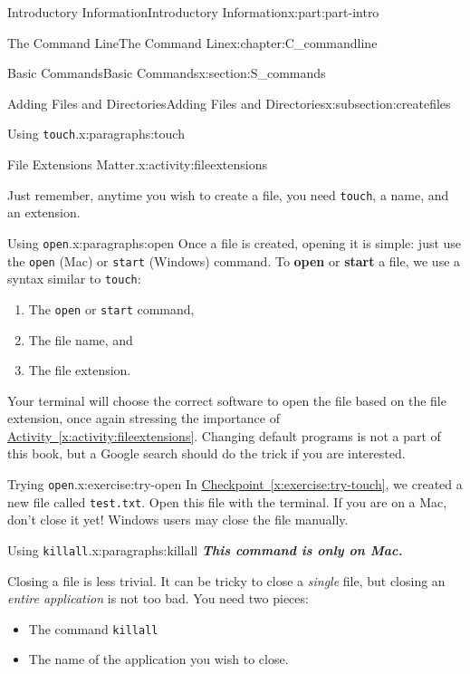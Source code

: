 \documentclass[oneside,10pt,]{book}
\newcommand{\xreffont}{\relax}
\newcommand{\mono}[1]{\texttt{#1}}
\newcommand{\alert}[1]{\textbf{\textit{#1}}}
\newcommand{\terminology}[1]{\textbf{#1}}
\begin{document}
\begin{partptx}{Introductory Information}{}{Introductory Information}{}{}{x:part:part-intro}
\begin{chapterptx}{The Command Line}{}{The Command Line}{}{}{x:chapter:C_commandline}
\begin{sectionptx}{Basic Commands}{}{Basic Commands}{}{}{x:section:S_commands}
\begin{subsectionptx}{Adding Files and Directories}{}{Adding Files and Directories}{}{}{x:subsection:createfiles}
\begin{paragraphs}{Using \mono{touch}.}{x:paragraphs:touch}
\begin{activity}{File Extensions Matter.}{x:activity:fileextensions}
\end{activity}%
Just remember, anytime you wish to create a file, you need \mono{touch}, a name, and an extension.%
\end{paragraphs}%
\begin{paragraphs}{Using \mono{open}.}{x:paragraphs:open}%
\index{\mono{open}}%
\index{\mono{start}}%
%
%
%
Once a file is created, opening it is simple: just use the \mono{open} (Mac) or \mono{start} (Windows) command. To \terminology{open} or \terminology{start} a file, we use a syntax similar to \mono{touch}:%
\begin{enumerate}
\item{}The \mono{open} or \mono{start} command,%
\item{}The file name, and%
\item{}The file extension.%
\end{enumerate}
Your terminal will choose the correct software to open the file based on the file extension, once again stressing the importance of \hyperref[x:activity:fileextensions]{Activity~{\xreffont\ref{x:activity:fileextensions}}}. Changing default programs is not a part of this book, but a Google search should do the trick if you are interested.%
\begin{inlineexercise}{Trying \mono{open}.}{x:exercise:try-open}%
In \hyperref[x:exercise:try-touch]{Checkpoint~{\xreffont\ref{x:exercise:try-touch}}}, we created a new file called \mono{test.txt}. Open this file with the terminal. If you are on a Mac, don't close it yet! Windows users may close the file manually.%
\end{inlineexercise}%
\end{paragraphs}%
\begin{paragraphs}{Using \mono{killall}.}{x:paragraphs:killall}%
\index{\mono{killall}}%
%
\index{command line!\mono{killall}}%
\alert{This command is only on Mac.}%
\par
Closing a file is less trivial. It can be tricky to close a \emph{single} file, but closing an \emph{entire application} is not too bad. You need two pieces:%
\begin{itemize}[label=\textbullet]
\item{}The command \mono{killall}%
\item{}The name of the application you wish to close.%
\end{itemize}

\end{paragraphs}
\end{subsectionptx}
\end{sectionptx}
\end{chapterptx}
\end{partptx}
\end{document}

